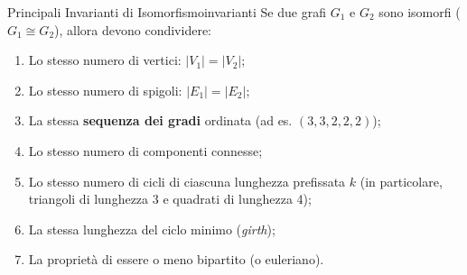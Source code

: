 \begin{proposizione}{Principali Invarianti di Isomorfismo}{invarianti}
Se due grafi $G_1$ e $G_2$ sono isomorfi ($G_1 \cong G_2$), allora devono condividere:
\begin{enumerate}
    \item Lo stesso numero di vertici: $|V_1| = |V_2|$;
    \item Lo stesso numero di spigoli: $|E_1| = |E_2|$;
    \item La stessa \textbf{sequenza dei gradi} ordinata (ad es. $(3, 3, 2, 2, 2)$);
    \item Lo stesso numero di componenti connesse;
    \item Lo stesso numero di cicli di ciascuna lunghezza prefissata $k$ (in particolare, triangoli di lunghezza 3 e quadrati di lunghezza 4);
    \item La stessa lunghezza del ciclo minimo (\emph{girth});
    \item La proprietà di essere o meno bipartito (o euleriano).
\end{enumerate}
\end{proposizione}

